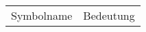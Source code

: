 \thispagestyle{empty}
\label{cha:Symbole} 



\begin{longtable}{ll}

Symbolname&Bedeutung\\

\end{longtable}


